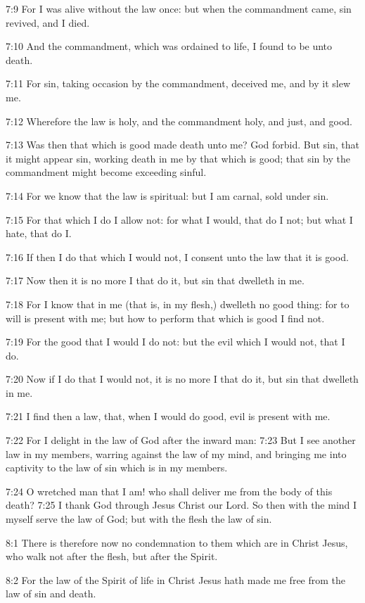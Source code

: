 7:9 For I was alive without the law once: but when the commandment
came, sin revived, and I died.

7:10 And the commandment, which was ordained to life, I found to be
unto death.

7:11 For sin, taking occasion by the commandment, deceived me, and by
it slew me.

7:12 Wherefore the law is holy, and the commandment holy, and just,
and good.

7:13 Was then that which is good made death unto me? God forbid. But
sin, that it might appear sin, working death in me by that which is
good; that sin by the commandment might become exceeding sinful.

7:14 For we know that the law is spiritual: but I am carnal, sold
under sin.

7:15 For that which I do I allow not: for what I would, that do I not;
but what I hate, that do I.

7:16 If then I do that which I would not, I consent unto the law that
it is good.

7:17 Now then it is no more I that do it, but sin that dwelleth in me.

7:18 For I know that in me (that is, in my flesh,) dwelleth no good
thing: for to will is present with me; but how to perform that which
is good I find not.

7:19 For the good that I would I do not: but the evil which I would
not, that I do.

7:20 Now if I do that I would not, it is no more I that do it, but sin
that dwelleth in me.

7:21 I find then a law, that, when I would do good, evil is present
with me.

7:22 For I delight in the law of God after the inward man: 7:23 But I
see another law in my members, warring against the law of my mind, and
bringing me into captivity to the law of sin which is in my members.

7:24 O wretched man that I am! who shall deliver me from the body of
this death?  7:25 I thank God through Jesus Christ our Lord. So then
with the mind I myself serve the law of God; but with the flesh the
law of sin.

8:1 There is therefore now no condemnation to them which are in Christ
Jesus, who walk not after the flesh, but after the Spirit.

8:2 For the law of the Spirit of life in Christ Jesus hath made me
free from the law of sin and death.

